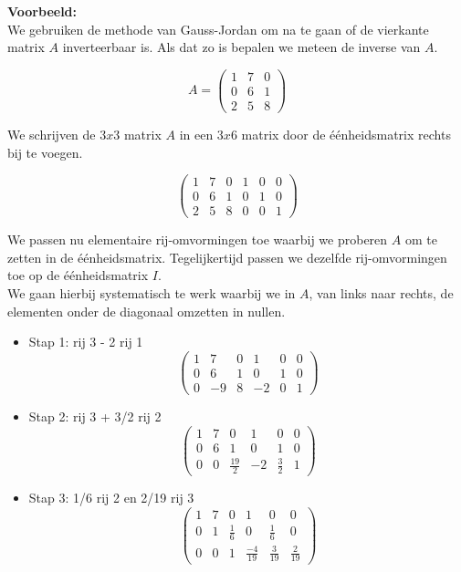 {\bf Voorbeeld:} \\

We gebruiken de methode van Gauss-Jordan om na te gaan of de vierkante matrix $A$ inverteerbaar is. Als dat zo is bepalen we meteen de inverse van $A$.

\[ A=\left( \begin{matrix}
1 & 7 & 0 \\
0 & 6 & 1 \\
2 & 5 & 8
\end{matrix} \right)   \]

We schrijven de $3x3$ matrix $A$ in een $3x6$ matrix door de \'{e}\'{e}nheidsmatrix rechts bij te voegen.

\[ \left( \begin{matrix}
1 & 7 & 0 & 1 & 0 & 0 \\
0 & 6 & 1 & 0 & 1 & 0 \\
2 & 5 & 8 & 0 & 0 & 1 \end{matrix} \right) 
\] 

We passen nu elementaire rij-omvormingen toe waarbij we proberen $A$ om te zetten in de \'{e}\'{e}nheidsmatrix. Tegelijkertijd passen we dezelfde rij-omvormingen toe op de \'{e}\'{e}nheidsmatrix $I$.\\
We gaan hierbij systematisch te werk waarbij we in $A$, van links naar rechts, de elementen onder de diagonaal omzetten in nullen. 

\begin{itemize}
	\item Stap 1: rij 3 - 2 rij 1 
	\[ \left( \begin{matrix}
	1 & 7 & 0 & 1 & 0 & 0 \\
	0 & 6 & 1 & 0 & 1 & 0 \\
	0 & -9 & 8 & -2 & 0 & 1 \end{matrix} \right) 
	\] 
	\item Stap 2: rij 3 + 3/2 rij 2 
	\[ \left( \begin{matrix}
	1 & 7 & 0 & 1 & 0 & 0 \\
	0 & 6 & 1 & 0 & 1 & 0 \\
	0 & 0 & \frac{19}{2} & -2 & \frac{3}{2} & 1 \end{matrix} \right) 
	\] 
	\item Stap 3: 1/6 rij 2 en 2/19 rij 3 
	\[ \left( \begin{matrix}
	1 & 7 & 0 & 1 & 0 & 0 \\
	0 & 1 & \frac{1}{6} & 0 & \frac{1}{6} & 0 \\
	0 & 0 & 1 & \frac{-4}{19} & \frac{3}{19} & \frac{2}{19} \end{matrix} \right) 
	\]
\end{itemize}

